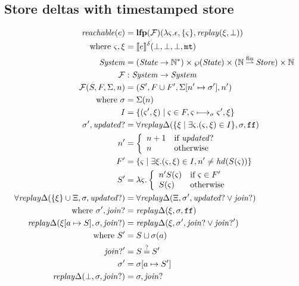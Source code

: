 \documentclass{llncs}
\newcommand{\finto}{\mathbin{\overset{\text{fin}}{\rightharpoonup}}}
\newcommand{\setof}[1]{\{ #1 \}}
\begin{document}
\subsection{Store deltas with timestamped store}

\begin{align*}
\mathit{reachable}(e) &= \lfp{{\mathcal F}}(\lambda\mstate. \epsilon, \setof{\mstate}, \replay(\msdiff,\bot)) \\
 \text{ where } \mstate, \msdiff &= \compile{e}^\mcntr(\bot,\bot,\bot,\kmt) \\
\System &= (\State \to {\mathbb N}^*) \times \wp(\State) \times ({\mathbb N} \finto \Store) \times {\mathbb N} \\
{\mathcal F} &: \System \to \System \\
{\mathcal F}(S,F,\Sigma,n) &= (S', F \cup F', \Sigma[n' \mapsto \msto'],n') \\
 \text{ where }
 \msto &= \Sigma(n) \\
  I &= \setof{ \ttuple{\mstate'}{\msdiff} \mid \mstate \in F, \mstate \machstep_\msto \mstate', \msdiff} \\
  \msto',\updatedp &=
     \replaychangeall(\setof{\msdiff \mid \exists \mstate. (\mstate, \msdiff) \in I}, \msto,\sfalse) \\
  n' &= \left\{\begin{array}{ll}
                n + 1 & \text{if } \updatedp \\
                n & \text{otherwise}
               \end{array}\right. \\
  F' &= \setof{\mstate \mid \exists \msdiff. (\mstate,\msdiff) \in I,
                n' \neq \hd(S(\mstate))} \\
  S' &= \lambda \mstate. \left\{\begin{array}{ll}
                                 n' S(\mstate) & \text{if } \mstate \in F' \\
                                 S(\mstate) & \text{otherwise}
                                \end{array}\right. \\
  \replaychangeall(\setof{\msdiff} \cup \Xi, \msto, \updatedp) &=
    \replaychangeall(\Xi, \msto', \updatedp \vee \joinp) \\
   \text{ where } \msto', \joinp &= \replaychange(\msdiff, \msto, \sfalse) \\
  \replaychange(\msdiff[\maddr \mapsto S], \msto, \joinp) &=
   \replaychange(\msdiff, \msto', \joinp \vee \joinp') \\
  \text{ where } S' &= S \sqcup \msto(\maddr) \\
                 \joinp' &= S \deceq S' \\
                 \msto' &= \msto[\maddr \mapsto S'] \\
  \replaychange(\bot, \msto, \joinp) &= \msto, \joinp
\end{align*}
\end{document}
